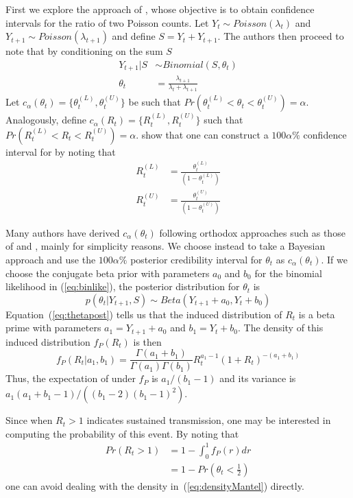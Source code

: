 First we explore the approach of \cite{mantel}, whose objective is to obtain 
confidence intervals for the ratio of two Poisson counts. 
Let $Y_{t} \sim Poisson(\lambda_t)$ and $Y_{t+1} \sim Poisson(\lambda_{t+1})$ 
and define $S = Y_{t} + Y_{t+1}$.
The authors then proceed to note that by conditioning on the sum $S$
\begin{align}
\label{eq:binlike}
Y_{t+1} | S &\sim Binomial(S, \theta_t) \\
\theta_t &= \frac{\lambda_{t+1}}{\lambda_{t} + \lambda_{t+1}}
\end{align}
Let $c_{\alpha}(\theta_t) = \{\theta_t^{(L)} , \theta_t^{(U)} \}$ be such that 
$Pr(\theta_t^{(L)}<\theta_t <\theta_t^{(U)}) = \alpha$.
Analogously, define $c_{\alpha}(R_t) = \{R_t^{(L)} , R_t^{(U)} \}$ such that 
$Pr(R_t^{(L)}<R_t<R_t^{(U)}) = \alpha$.
\cite{mantel} show that one can construct a $100\alpha \%$ confidence interval 
for \rr by noting that
\begin{align}
 R_t^{(L)} &= \frac{\theta_t^{(L)}}{(1-\theta_t^{(L)})}\\
 R_t^{(U)} &= \frac{\theta_t^{(U)}}{(1-\theta_t^{(U)})}
\end{align}

Many authors have derived $c_{\alpha}(\theta_t)$ following orthodox approaches 
such as those of \cite{wilson} and \cite{clopper}, mainly for simplicity 
reasons.
We choose instead to take a Bayesian approach and use the  $100\alpha \%$ 
posterior credibility interval for $\theta_t$ as $c_{\alpha}(\theta_t)$.
If we choose the conjugate beta prior with parameters $a_0$ and $b_0$ for the 
binomial likelihood in (\ref{eq:binlike}), the posterior distribution for 
$\theta_t$ is
\begin{equation}
\label{eq:thetapost}
p(\theta_t| Y_{t+1}, S) \sim Beta(Y_{t+1} + a_0, Y_t + b_0)
\end{equation}
Equation~(\ref{eq:thetapost}) tells us that the induced distribution of $R_t$ is 
a beta prime with parameters $ a_1 = Y_{t+1} + a_0$ and $b_1 =  Y_t + b_0$.
The density of this induced distribution  $f_P(R_t)$ is then 
\begin{equation}
\label{eq:densityMantel}
f_P(R_t| a_1, b_1) = \frac{\Gamma(a_1 + b_1)}{\Gamma(a_1)\Gamma(b_1)} R_t^{a_1 - 
1} (1 + R_t)^{-(a_1 + b_1)}
\end{equation}
Thus, the expectation of \rr under $f_P$ is $a_1/(b_1 - 1)$ and its variance is 
$a_1(a_1 + b_1 - 1)/\left((b_1 - 2)(b_1 - 1)^2 \right) $.

Since when $R_t > 1$ indicates sustained transmission, one may be interested in 
computing the probability of this event.
By noting that
\begin{align}
\label{cumprobMantel}
Pr(R_t > 1) &= 1 - \int_0^1 f_P(r)dr \\
            &= 1- Pr(\theta_t < \frac{1}{2})
\end{align}
one can avoid dealing with the density in~(\ref{eq:densityMantel}) directly.

